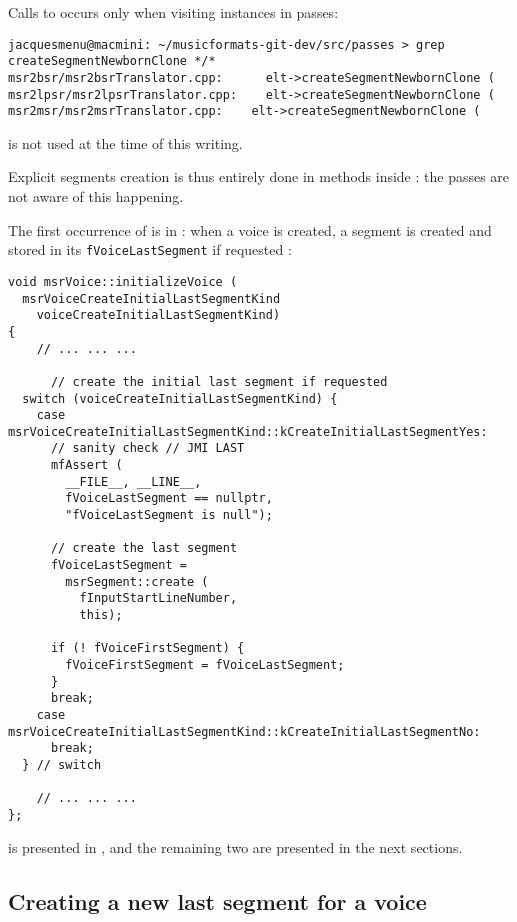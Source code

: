 Calls to  occurs only when visiting  instances in passes:
\begin{lstlisting}[language=Terminal]
jacquesmenu@macmini: ~/musicformats-git-dev/src/passes > grep createSegmentNewbornClone */*
msr2bsr/msr2bsrTranslator.cpp:      elt->createSegmentNewbornClone (
msr2lpsr/msr2lpsrTranslator.cpp:    elt->createSegmentNewbornClone (
msr2msr/msr2msrTranslator.cpp:    elt->createSegmentNewbornClone (
\end{lstlisting}

 is not used at the time of this writing.

Explicit segments creation is thus entirely done in methods inside : the passes are not aware of this happening.

The first occurrence of  is in : when a voice is created, a segment is created and stored in its {\tt fVoiceLastSegment} if requested :
\begin{lstlisting}[language=CPlusPlus]
void msrVoice::initializeVoice (
  msrVoiceCreateInitialLastSegmentKind
    voiceCreateInitialLastSegmentKind)
{
	// ... ... ...

	  // create the initial last segment if requested
  switch (voiceCreateInitialLastSegmentKind) {
    case msrVoiceCreateInitialLastSegmentKind::kCreateInitialLastSegmentYes:
      // sanity check // JMI LAST
      mfAssert (
        __FILE__, __LINE__,
        fVoiceLastSegment == nullptr,
        "fVoiceLastSegment is null");

      // create the last segment
      fVoiceLastSegment =
        msrSegment::create (
          fInputStartLineNumber,
          this);

      if (! fVoiceFirstSegment) {
        fVoiceFirstSegment = fVoiceLastSegment;
      }
      break;
    case msrVoiceCreateInitialLastSegmentKind::kCreateInitialLastSegmentNo:
      break;
  } // switch

	// ... ... ...
};
\end{lstlisting}

 is presented in , and the remaining two are presented in the next sections.


\subsection{Creating a new last segment for a voice}


